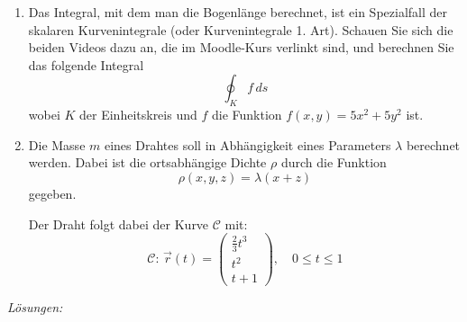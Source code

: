 \begin{ueb}
\begin{enumerate}
              \begin{enumerate}
                  \item Berechnen Sie den Geschwindigkeitsvektor zur Zeit \(t=0\) und den Beschleunigungsvektor und überprüfen Sie, ob diese zu den Angaben im Text passen.
                  \item Berechnen Sie, wie lange es dauert, bis der Ball wieder auf den Boden prallt, und die (Bogen)-Länge der Flugbahn. (Integral numerisch mit dem Taschenrechner berechnen)
              \end{enumerate}


        \item Das Integral, mit dem man die Bogenlänge berechnet, ist ein Spezialfall der skalaren Kurvenintegrale (oder Kurvenintegrale 1. Art). Schauen Sie sich die beiden Videos dazu an, die im Moodle-Kurs verlinkt sind, und berechnen Sie das folgende Integral
              \[ \oint_K f\, ds\]
              wobei \(K\) der Einheitskreis und \(f\) die Funktion \(f(x,y)=5x^2+5y^2\) ist.

        \item Die Masse \( m \) eines Drahtes soll in Abhängigkeit eines Parameters \( \lambda \) berechnet werden. Dabei ist die ortsabhängige Dichte \( \rho \) durch die Funktion
              \[ \rho(x,y,z) = \lambda(x + z) \]
              gegeben.

              Der Draht folgt dabei der Kurve \( \mathcal{C} \) mit:
              \[
                  \mathcal{C} : \, \vec{r}(t) = \begin{pmatrix}
                      \frac{2}{3}t^3 \\
                      t^2            \\
                      t+1
                  \end{pmatrix}, \quad 0 \leq t \leq 1
              \]

    \end{enumerate}

\end{ueb}
\clearpage
\emph{Lösungen:}
